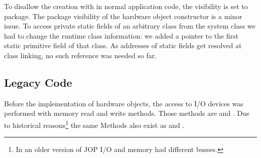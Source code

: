 To disallow the creation with  in normal application code,
the visibility is set to package. The package visibility of the
hardware object constructor is a minor issue.
%
%
%
%
To access private static fields of an arbitrary class from the system
class we had to change the runtime class information: we added a
pointer to the first static primitive field of that class. As
addresses of static fields get resolved at class linking, no such
reference was needed so far.

\subsection{Legacy Code}

Before the implementation of hardware objects, the access to I/O
devices was performed with memory read and write methods. Those
methods are  and . Due to
historical reasons\footnote{In an older version of JOP I/O and memory
had different busses.} the same Methods also exist as
 and .

